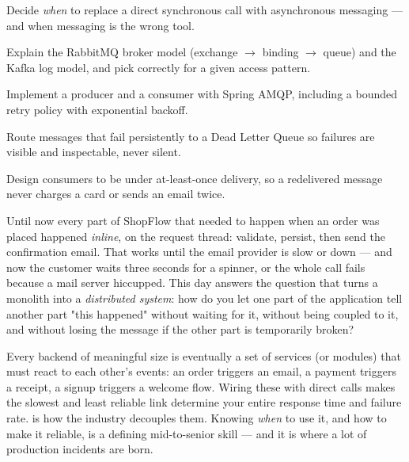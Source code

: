 
\begin{objectives}
\begin{wbitem}
  \item Decide \emph{when} to replace a direct synchronous call with asynchronous messaging --- and when messaging is the wrong tool.
  \item Explain the RabbitMQ broker model (exchange $\rightarrow$ binding $\rightarrow$ queue) and the Kafka log model, and pick correctly for a given access pattern.
  \item Implement a producer and a consumer with Spring AMQP, including a bounded retry policy with exponential backoff.
  \item Route messages that fail persistently to a Dead Letter Queue so failures are visible and inspectable, never silent.
  \item Design consumers to be  under at-least-once delivery, so a redelivered message never charges a card or sends an email twice.
\end{wbitem}
\end{objectives}


 Until now every part of ShopFlow that needed to happen when an order was placed happened \emph{inline}, on the request thread: validate, persist, then send the confirmation email. That works until the email provider is slow or down --- and now the customer waits three seconds for a spinner, or the whole  call fails because a mail server hiccupped. This day answers the question that turns a monolith into a \emph{distributed system}: how do you let one part of the application tell another part "this happened" without waiting for it, without being coupled to it, and without losing the message if the other part is temporarily broken?

 Every backend of meaningful size is eventually a set of services (or modules) that must react to each other's events: an order triggers an email, a payment triggers a receipt, a signup triggers a welcome flow. Wiring these with direct calls makes the slowest and least reliable link determine your entire response time and failure rate.  is how the industry decouples them. Knowing \emph{when} to use it, and how to make it reliable, is a defining mid-to-senior skill --- and it is where a lot of production incidents are born.

